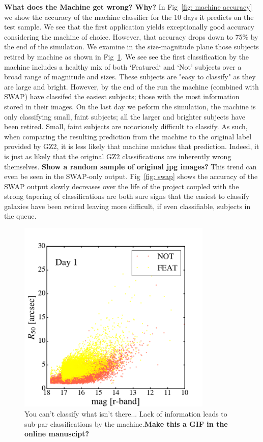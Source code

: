 \documentclass[twocolumn]{aastex6}
\begin{document}
\textbf{What does the Machine get wrong? Why?}  In Fig~\ref{fig: machine accuracy} 
we show the accuracy of the machine classifier for the 10 days it predicts on the test sample. 
We see that the first application yields exceptionally good accuracy considering
the machine of choice. However, that accuracy drops down to 75\% by the end of the simulation.
We examine in the size-magnitude plane those  subjects retired by machine as 
shown in Fig~\ref{fig: machine classified}.  We see see the first classification by
the machine includes a healthy mix of both `Featured` and `Not' subjects over a 
broad range of magnitude and sizes. These subjects are "easy to classify" as they are
large and bright. However, by the end of the run the machine (combined with SWAP)
have classifed the easiest subjects; those with the most information stored in their images. 
On the last day we peform the simulation, the machine is only classifying small, faint 
subjects; all the larger and brighter subjects have been retired. Small, faint subjects are 
notoriously difficult to classify. As such, when comparing the resulting prediction from
the machine to the original label provided by GZ2, it is less likely that machine matches
that prediction. Indeed, it is just as likely that the original GZ2 classifications are inherently 
wrong themselves. \textbf{Show a random sample of original jpg images? } 
This trend can even be seen in the SWAP-only output. 
Fig~\ref{fig: swap} shows the accuracy of the SWAP output slowly decreases 
over the life of the project coupled with the strong tapering of classifications 
are both sure signs that the easiest to classify galaxies have been retired leaving
more difficult, if even classifiable, subjects in the queue. 

\begin{figure}[t!]
\includegraphics[width=3.65in]{figures/GZ2_sup_PLPD5_p5_flipfeature2b_2009-02-25_00:00:00_RF_accuracy_size-mag.png}
\caption{You can't classify what isn't there... Lack of information leads to sub-par classifications by the machine.\textbf{Make this a GIF in the online manuscipt?} \label{fig: machine classified}}
\end{figure}
\end{document}
